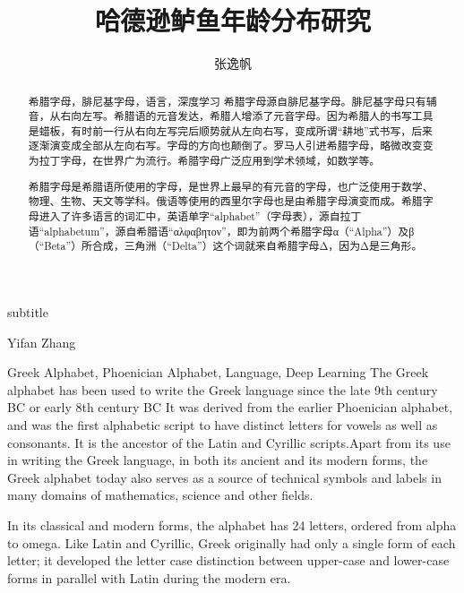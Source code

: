 \documentclass[experiment, printoneside]{seucoursepaper} %
\begin{document}

\title{哈德逊鲈鱼年龄分布研究}{}{}{subtitle}
\author{张逸帆}{Yifan Zhang}

\address{教学楼6 401}
\maketitle

\begin{abstract}{希腊字母，腓尼基字母，语言，深度学习}
希腊字母源自腓尼基字母。腓尼基字母只有辅音，从右向左写。希腊语的元音发达，希腊人增添了元音字母。因为希腊人的书写工具是蜡板，有时前一行从右向左写完后顺势就从左向右写，变成所谓“耕地”式书写，后来逐渐演变成全部从左向右写。字母的方向也颠倒了。罗马人引进希腊字母，略微改变变为拉丁字母，在世界广为流行。希腊字母广泛应用到学术领域，如数学等。

希腊字母是希腊语所使用的字母，是世界上最早的有元音的字母，也广泛使用于数学、物理、生物、天文等学科。俄语等使用的西里尔字母也是由希腊字母演变而成。希腊字母进入了许多语言的词汇中，英语单字“alphabet”（字母表），源自拉丁语“alphabetum”，源自希腊语“αλφαβητον”，即为前两个希腊字母α（“Alpha”）及β（“Beta”）所合成，三角洲（“Delta”）这个词就来自希腊字母Δ，因为Δ是三角形。
\end{abstract}

\begin{englishabstract}{Greek Alphabet, Phoenician Alphabet, Language, Deep Learning}
The Greek alphabet has been used to write the Greek language since the late 9th century BC or early 8th century BC It was derived from the earlier Phoenician alphabet, and was the first alphabetic script to have distinct letters for vowels as well as consonants. It is the ancestor of the Latin and Cyrillic scripts.Apart from its use in writing the Greek language, in both its ancient and its modern forms, the Greek alphabet today also serves as a source of technical symbols and labels in many domains of mathematics, science and other fields.

In its classical and modern forms, the alphabet has 24 letters, ordered from alpha to omega. Like Latin and Cyrillic, Greek originally had only a single form of each letter; it developed the letter case distinction between upper-case and lower-case forms in parallel with Latin during the modern era.
\end{englishabstract}
\end{document}
